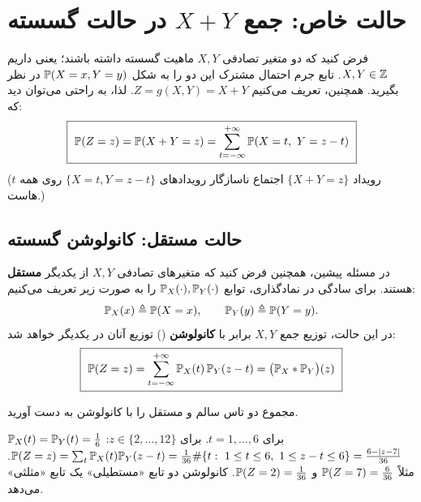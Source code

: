 \section{حالت خاص: جمع $X+Y$ در حالت گسسته}

فرض کنید که دو متغیر تصادفی $X,Y$ ماهیت گسسته داشته باشند؛ یعنی داریم $X,Y\in\mathbb{Z}$. تابع جرم احتمال مشترک این دو را به شکل $\mathbb{P}(X=x,Y=y)$ در نظر بگیرید. همچنین، تعریف می‌کنیم $Z=g(X,Y)=X+Y$. لذا، به راحتی می‌توان دید که:
\[
\boxed{\ \Prob(Z=z)=\Prob(X+Y=z)=\sum_{t=-\infty}^{+\infty}\Prob(X=t,\ Y=z-t)\ }
\]
(رویداد $\{X+Y=z\}$ اجتماع ناسازگار رویدادهای $\{X=t,Y=z-t\}$ روی همه $t$ هاست.)

\subsection{حالت مستقل: کانولوشن گسسته}
در مسئله پیشین، همچنین فرض کنید که متغیرهای تصادفی $X,Y$ از یکدیگر \textbf{مستقل} هستند. برای سادگی در نمادگذاری، توابع $\mathbb{P}_X(\cdot),\mathbb{P}_Y(\cdot)$ را به صورت زیر تعریف می‌کنیم:
\[
\mathbb{P}_X(x)\triangleq\mathbb{P}(X=x),\qquad \mathbb{P}_Y(y)\triangleq\mathbb{P}(Y=y).
\]
در این حالت، توزیع جمع $X,Y$ برابر با \textcolor{blue!60!black}{\textbf{کانولوشن}} () توزیع آنان در یکدیگر خواهد شد:
\[
\boxed{\ \Prob(Z=z)=\sum_{t=-\infty}^{+\infty}\Prob_X(t)\,\Prob_Y(z-t)=\big(\Prob_X*\Prob_Y\big)(z)\ }
\]

\begin{example}
 مجموع دو تاس سالم و مستقل را با کانولوشن به دست آورید.
\begin{solution}
$\mathbb{P}_X(t)=\mathbb{P}_Y(t)=\frac16$ برای $t=1,\ldots,6$. برای $z\in\{2,\ldots,12\}$:
$\Prob(Z=z)=\sum_t\Prob_X(t)\Prob_Y(z-t)=\frac{1}{36}\#\{t:\ 1\le t\le6,\ 1\le z-t\le6\}=\frac{6-|z-7|}{36}$.
مثلاً $\mathbb{P}(Z=7)=\frac6{36}$ و $\mathbb{P}(Z=2)=\frac1{36}$. کانولوشن دو تابع «مستطیلی» یک تابع «مثلثی» می‌دهد.
\end{solution}
\end{example}

